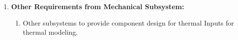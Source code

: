\documentclass[../../main.tex]{subfiles}
\begin{document}
\begin{enumerate}
    
    
    
    
   

    \item \textbf{Other Requirements from Mechanical Subsystem:}
    \begin{enumerate}
        \item Other subsystems to provide component design for thermal Inputs for thermal modeling.
    \end{enumerate}

\end{enumerate}
\end{document}
